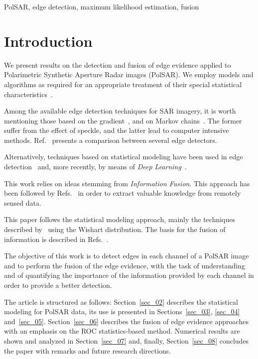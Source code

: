 \documentclass[conference]{IEEEtran}
\begin{document}
\begin{IEEEkeywords}
PolSAR, edge detection, maximum likelihood estimation, fusion
\end{IEEEkeywords}

\section{Introduction}\label{sec_01}

We present results on the detection and fusion of edge evidence applied to Polarimetric Synthetic Aperture Radar images (PolSAR). 
We employ models and algorithms as required for an appropriate treatment of their special statistical characteristics~\cite{slf_2008}.

Among the available edge detection techniques for SAR imagery, it is worth mentioning those based on the gradient~\cite{tlb, obw, flmc, fyf}, and on Markov chains~\cite{bf}.
The former suffer from the effect of speckle, and the latter lead to computer intensive methods.
Ref.~\cite{gfn} presents a comparison between several edge detectors. 

Alternatively, techniques based on statistical modeling have been used in edge detection~\cite{gmbf, fbgm, horrit, gfn} and, more recently, by means of \textit{Deep Learning}~\cite{bac, ztmxzxf, tabmm, xstz}.

This work relies on ideas stemming from \textit{Information Fusion}.
This approach has been followed by Refs.~\cite{sglmla,sg} in order to extract valuable knowledge from remotely sensed data.

This paper follows the statistical modeling approach, mainly the techniques described by~\cite{fbgm, nhfc} using the Wishart distribution.
The basis for the fusion of information is described in Refs.~\cite{mit, sg}. 

The objective of this work is to detect edges in each channel of a PolSAR image and to perform the fusion of the edge evidence, with the task of understanding and of quantifying the importance of the information provided by each channel in order to provide a better detection.

The article is structured as follows: 
Section~\ref{sec_02} describes the statistical modeling for PolSAR data, 
its use is presented in Sections~\ref{sec_03}, \ref{sec_04} and~\ref{sec_05}.
Section~\ref{sec_06} describes the fusion of edge evidence approaches with an emphasis on the ROC statistics-based method.
Numerical results are shown and analyzed in Section~\ref{sec_07} and, finally, Section~\ref{sec_08} concludes the paper with remarks and future research directions.
\end{document}
